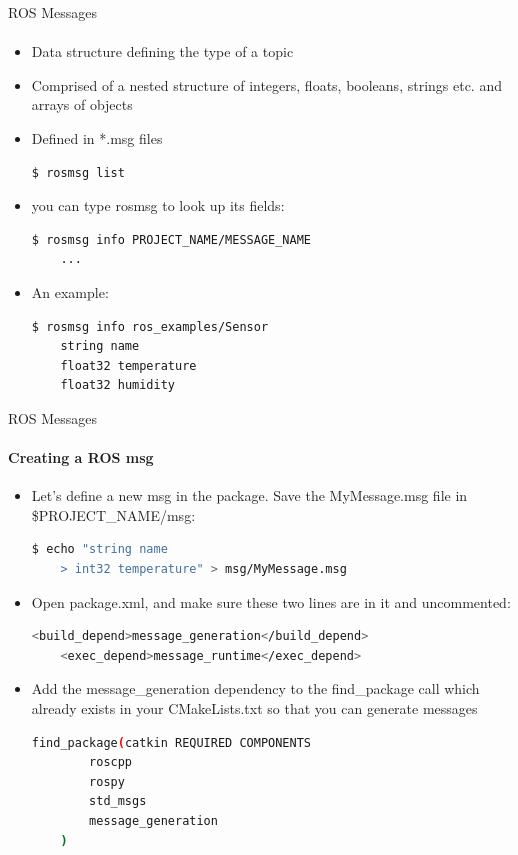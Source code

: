 \documentclass[aspectratio=169]{beamer}
\begin{document}
\begin{frame}[fragile]{ROS Messages}
	\framesubtitle{ }
	\begin{minipage}{0.6\textwidth}
    \begin{itemize}
        \item Data structure defining the type of a topic
		\item Comprised of a nested structure of integers, floats, booleans, strings etc. and arrays of objects
		\item Defined in *.msg files
		\begin{lstlisting}[language=bash]
	$ rosmsg list
		\end{lstlisting}
		\item you can type rosmsg to look up its fields:
		\begin{lstlisting}[language=bash]
	$ rosmsg info PROJECT_NAME/MESSAGE_NAME
	...
		\end{lstlisting}

		\item An example:
		\begin{lstlisting}[language=bash]
	$ rosmsg info ros_examples/Sensor 
	string name
	float32 temperature
	float32 humidity	
		\end{lstlisting}

    \end{itemize}

\end{minipage}
\begin{minipage}{0.4\textwidth}
	
\end{minipage}
\end{frame}


\begin{frame}[fragile]{ROS Messages}
	\framesubtitle{Creating a ROS msg}
    \begin{itemize}
        \item Let's define a new msg in the package. Save the MyMessage.msg file in \$PROJECT\_NAME/msg:
		\begin{lstlisting}[language=bash]
	$ echo "string name
	> int32 temperature" > msg/MyMessage.msg
		\end{lstlisting}
		\item Open package.xml, and make sure these two lines are in it and uncommented:
		\begin{lstlisting}[language=bash]
	<build_depend>message_generation</build_depend>
	<exec_depend>message_runtime</exec_depend>
		\end{lstlisting}
		\item Add the message\_generation dependency to the find\_package call which already exists in your CMakeLists.txt so that you can generate messages
		\begin{lstlisting}[language=bash]
	find_package(catkin REQUIRED COMPONENTS
		roscpp
		rospy
		std_msgs
		message_generation
	)
		\end{lstlisting}

	
    \end{itemize}
\end{frame}
\end{document}
